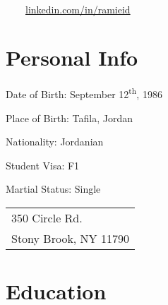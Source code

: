\documentclass[a4paper, oneside, final]{scrartcl}
\begin{document}
      \begin{center}
      \textsc{\Huge{}}\\

       \,\,\,\,\,\,\,\,\,\, \url{linkedin.com/in/ramieid} \\
            \end{center}
\section{Personal Info}
\vspace{-14pt}
\begin{compactitem}
\begin{multicols}{2}
      \item Date of Birth: September 12\textsuperscript{th}, 1986 
      \item Place of Birth: Tafila, Jordan 
      \item Nationality: Jordanian
      \item Student Visa: F1
      \item Martial Status: Single \\
	\item 
 \begin{tabular}[t]{l}350 Circle Rd. \\
Stony Brook,  NY 11790
 \end{tabular}
\end{multicols}
\end{compactitem}
\vspace{-4pt}

\section{Education}
\end{document}
